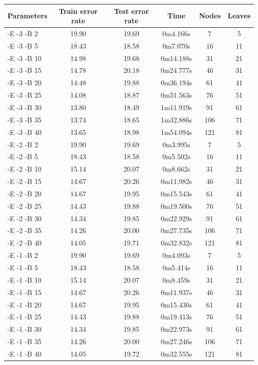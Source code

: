 \documentclass[a4paper]{llncs}
\begin{document}
\begin{table}[ht]
  \begin{center}
  \begin{tabular}{ | l | c | c | c | c | c |}
    \hline
    \textbf{Parameters} & \textbf{Train error rate} & \textbf{Test error rate} & \textbf{Time} & \textbf{Nodes} & \textbf{Leaves} \\ \hline
    -E -3 -B 2 & 19.90 & 19.69 & 0m4.166s & 7 & 5 \\ \hline
    -E -3 -B 5 & 18.43 & 18.58 & 0m7.070s & 16 & 11 \\ \hline
    -E -3 -B 10 & 14.98 & 19.68 & 0m14.188s & 31 & 21 \\ \hline
    -E -3 -B 15 & 14.78 & 20.18 & 0m24.777s & 46 & 31 \\ \hline
    -E -3 -B 20 & 14.48 & 19.88 & 0m36.194s & 61 & 41 \\ \hline
    -E -3 -B 25 & 14.08 & 18.87 & 0m51.563s & 76 & 51 \\ \hline
    -E -3 -B 30 & 13.80 & 18.49 & 1m11.919s & 91 & 61 \\ \hline
    -E -3 -B 35 & 13.74 & 18.65 & 1m32.886s & 106 & 71 \\ \hline
    -E -3 -B 40 & 13.65 & 18.98 & 1m54.094s & 121 & 81 \\ \hline
    
    -E -2 -B 2 & 19.90 & 19.69 & 0m3.995s & 7 & 5 \\ \hline
    -E -2 -B 5 & 18.43 & 18.58 & 0m5.502s & 16 & 11 \\ \hline
    -E -2 -B 10 & 15.14 & 20.07 & 0m8.662s & 31 & 21 \\ \hline
    -E -2 -B 15 & 14.67 & 20.26 & 0m11.982s & 46 & 31 \\ \hline
    -E -2 -B 20 & 14.67 & 19.95 & 0m15.543s & 61 & 41 \\ \hline
    -E -2 -B 25 & 14.43 & 19.88 & 0m19.500s & 76 & 51 \\ \hline
    -E -2 -B 30 & 14.34 & 19.85 & 0m22.929s & 91 & 61 \\ \hline
    -E -2 -B 35 & 14.26 & 20.00 & 0m27.735s & 106 & 71 \\ \hline
    -E -2 -B 40 & 14.05 & 19.71 & 0m32.832s & 121 & 81 \\ \hline
    
    
    -E -1 -B 2 & 19.90 & 19.69 & 0m4.093s & 7 & 5 \\ \hline
    -E -1 -B 5 & 18.43 & 18.58 & 0m5.414s & 16 & 11 \\ \hline
    -E -1 -B 10 & 15.14 & 20.07 & 0m8.459s & 31 & 21 \\ \hline
    -E -1 -B 15 & 14.67 & 20.26 & 0m11.937s & 46 & 31 \\ \hline
    -E -1 -B 20 & 14.67 & 19.95 & 0m15.430s & 61 & 41 \\ \hline
    -E -1 -B 25 & 14.43 & 19.88 & 0m19.413s & 76 & 51 \\ \hline
    -E -1 -B 30 & 14.34 & 19.85 & 0m22.973s & 91 & 61 \\ \hline
    -E -1 -B 35 & 14.26 & 20.00 & 0m27.246s & 106 & 71 \\ \hline
    -E -1 -B 40 & 14.05 & 19.72 & 0m32.555s & 121 & 81 \\ \hline
    

\end{tabular}
\end{center}
\end{table}
\end{document}
